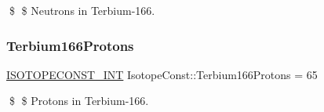 \$ \$ Neutrons in Terbium-\/166. \mbox{\label{group___isotope_const-_terbium-_tb166_ga09f02423136bcb7a29e92da8b5bdeed2}} 
\subsubsection{\texorpdfstring{Terbium166\+Protons}{Terbium166Protons}}
{\footnotesize\ttfamily \mbox{\hyperlink{group___isotope_const-_macros_ga5f18360b3e99483a35c32d789e62621c}{I\+S\+O\+T\+O\+P\+E\+C\+O\+N\+S\+T\+\_\+\+I\+NT}} Isotope\+Const\+::\+Terbium166\+Protons = 65}

\$ \$ Protons in Terbium-\/166. 